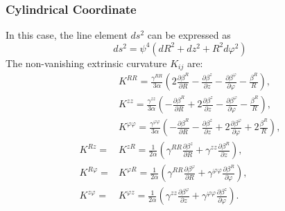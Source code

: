 \subsubsection*{Cylindrical Coordinate}
In this case, the line element $ds^2$ can be expressed as
\begin{equation}
 ds^2 = \psi^4 ( dR^2 + dz^2 + R^2 d\varphi^2 )
\end{equation}
The non-vanishing extrinsic curvature $K_{ij}$ are:
\begin{align}
	&K^{RR} = \frac{\gamma^{RR}}{3 \alpha} \left( 2 \frac{\partial \beta^R}{\partial R}  - \frac{\partial \beta^z}{\partial z} - \frac{\partial \beta^\varphi }{\partial \varphi} - \frac{\beta^R}{R} \right) ,\\
	&K^{zz} = \frac{\gamma^{zz}}{3 \alpha} \left( - \frac{\partial \beta^R}{\partial R} + 2 \frac{\partial \beta^z}{\partial z} - \frac{\partial \beta^\varphi }{\partial \varphi} - \frac{\beta^R}{R} \right) ,\\
	&K^{\varphi \varphi} = \frac{\gamma^{\varphi \varphi}}{3 \alpha} \left( - \frac{\partial  \beta^R}{\partial R} - \frac{\partial \beta^z }{\partial z} + 2 \frac{\partial \beta^\varphi}{\partial \varphi}  + 2\frac{\beta^R}{R} \right) ,\\
	K^{Rz} = &K^{zR} = \frac{1}{2 \alpha} \left( \gamma^{RR} \frac{\partial  \beta^z}{\partial R} + \gamma^{zz} \frac{\partial  \beta^R}{\partial z} \right) ,\\
	K^{R\varphi} = &K^{\varphi R} = \frac{1}{2 \alpha} \left( \gamma^{RR} \frac{\partial \beta^\varphi }{\partial R} + \gamma^{\varphi \varphi} \frac{\partial \beta^R}{\partial \varphi}  \right) ,\\
	K^{z\varphi} = &K^{\varphi z} = \frac{1}{2 \alpha} \left( \gamma^{zz} \frac{\partial \beta^\varphi }{\partial z} + \gamma^{\varphi \varphi} \frac{\partial \beta^z}{\partial \varphi}  \right) .
\end{align}


